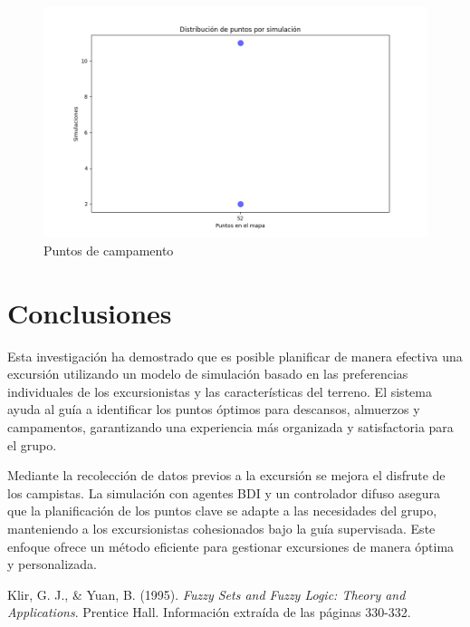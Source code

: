\documentclass[10pt,twocolumn]{article}
\begin{document}
	\begin{figure}
		\centering
		\includegraphics[width=1\linewidth]{camp_stats}
		\caption{Puntos de campamento}
		\label{Puntos de campamento}
	\end{figure}

	
	
	\section{Conclusiones}
	Esta investigación ha demostrado que es posible planificar de manera efectiva una excursión utilizando un modelo de simulación basado en las preferencias individuales de los excursionistas y las características del terreno. El sistema ayuda al guía a identificar los puntos óptimos para descansos, almuerzos y campamentos, garantizando una experiencia más organizada y satisfactoria para el grupo. 
	
	Mediante la recolección de datos previos a la excursión se mejora el disfrute de los campistas. La simulación con agentes BDI y un controlador difuso asegura que la planificación de los puntos clave se adapte a las necesidades del grupo, manteniendo a los excursionistas cohesionados bajo la guía supervisada. Este enfoque ofrece un método eficiente para gestionar excursiones de manera óptima y personalizada.
	
	
	\begin{thebibliography}{9}
		
		 Klir, G. J., \& Yuan, B. (1995). \textit{Fuzzy Sets and Fuzzy Logic: Theory and Applications}. Prentice Hall. Información extraída de las páginas 330-332.
		
	\end{thebibliography}
	
	
\end{document}
